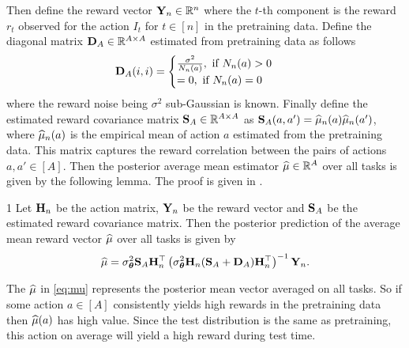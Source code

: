%
Then define the reward vector $\mathbf{Y}_n \in \mathbb{R}^n$ where the $t$-th component is the reward $r_t$ observed for the action $I_t$ for $t\in[n]$ in the pretraining data.
%
Define the diagonal matrix $\mathbf{D}_A\in\mathbb{R}^{A\times A}$ estimated from pretraining data as follows
\begin{align}
    \bD_A(i,i) &= \begin{cases}
        \frac{\sigma^2}{N_n(a)}, \text{ if } N_n(a) > 0\\ \label{eq:D-matrix}
        = 0, \text{ if } N_n(a) = 0
    \end{cases}
    \vspace*{-1em}
\end{align}
%
where the reward noise being $\sigma^2$ sub-Gaussian is known. 
%
Finally define the estimated reward covariance matrix $\mathbf{S}_A\in\mathbb{R}^{A\times A}$ as $\mathbf{S}_A(a,a') = \widehat{\mu}_n(a)\widehat{\mu}_n(a')$, where $\widehat{\mu}_n(a)$ is the empirical mean of action $a$ estimated from the pretraining data. This matrix captures the reward correlation between the pairs of actions $a,a'\in [A]$.
%
%
%
%
%
Then the posterior average mean estimator $\widehat{\mu}\in\mathbb{R}^A$ over all tasks is given by the following lemma. The proof is given in .
\begin{customlemma}{1}
\label{lemma:bayes-reg-1}
    Let $\mathbf{H}_n$ be the action matrix, $\mathbf{Y}_n$ be the reward vector and $\mathbf{S}_A$ be the estimated reward covariance matrix. Then the posterior prediction of the average mean reward vector $\widehat{\mu}$ over all tasks is given by
    \begin{align}
        \widehat{\mu} = \sigma^2_{\boldsymbol{\theta}}\mathbf{S}_A\mathbf{H}_n^\top\left(\sigma^2_{\boldsymbol{\theta}}\mathbf{H}_n(\mathbf{S}_A + \mathbf{D}_A)\mathbf{H}_n^\top\right)^{-1}\mathbf{Y}_{n}. \label{eq:mu}
    \end{align}
\end{customlemma}
%
The $\widehat{\mu}$ in \eqref{eq:mu} represents the posterior mean vector averaged on all tasks. So if some action $a\in [A]$ consistently yields high rewards in the pretraining data then $\widehat{\mu}(a)$ has high value. Since the test distribution is the same as pretraining, this action on average will yield a high reward during test time.  
%
%

